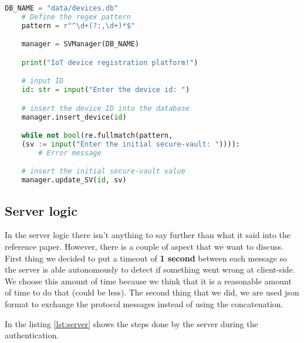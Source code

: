\begin{lstlisting}[language=Python, basicstyle=\small, label= {lst:registration}, caption=Device registration script]
    DB_NAME = "data/devices.db"
    # Define the regex pattern
    pattern = r"^\d+(?:,\d+)*$"

    manager = SVManager(DB_NAME)

    print("IoT device registration platform!")

    # input ID
    id: str = input("Enter the device id: ")

    # insert the device ID into the database
    manager.insert_device(id)

    while not bool(re.fullmatch(pattern, 
    (sv := input("Enter the initial secure-vault: ")))):
        # Error message

    # insert the initial secure-vault value
    manager.update_SV(id, sv)
\end{lstlisting}

\subsection{Server logic}
In the server logic there isn't anything to say further than what it said into the reference paper. However, there is a couple of aspect that we want to discuss. First thing we decided to put a timeout of \textbf{1 second} between each message so the server is able autonomously to detect if something went wrong at client-side. We choose this amount of time because we think that it is a reasonable amount of time to do that (could be less). The second thing that we did, we are used json format to exchange the protocol messages instead of using the concatenation.

In the listing \ref{lst:server} shows the steps done by the server during the authentication.

